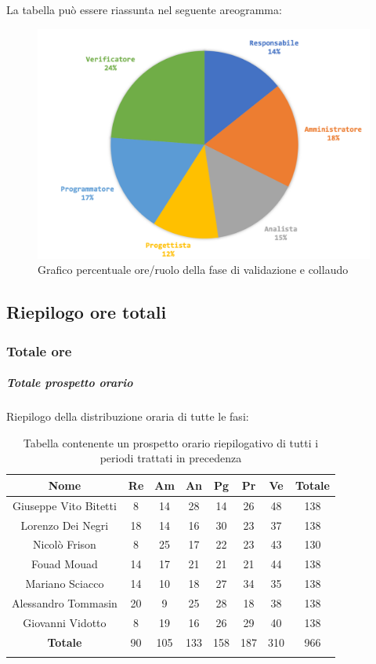 		La tabella può essere riassunta nel seguente areogramma:
		\begin{figure}[H]
			\centering
			\includegraphics[width=0.8\linewidth]{./images/preventivo/validColl2.png}
			\caption{Grafico percentuale ore/ruolo della fase di validazione e collaudo}
			\label{fig:grafico costi ruolo fase di validazione e collaudo}
		\end{figure}		
		

		
	\subsection{Riepilogo ore totali}
		\subsubsection{Totale ore}
			\subparagraph{Totale prospetto orario }
			Riepilogo della distribuzione oraria di tutte le fasi:
			\begin{longtable}{|c|c|c|c|c|c|c|c|}
				\hline
				\rowcolor{lighter-grayer}
				\textbf{Nome} & \textbf{Re} & \textbf{Am} & \textbf{An} & \textbf{Pg}  & \textbf{Pr}   & \textbf{Ve} & \textbf{Totale} \\
				\hline
				\endfirsthead
				
				\hline
				Giuseppe Vito Bitetti 		& 8 & 14 & 28 & 14 & 26 & 48 & 138\\
				\hline
				\hline
				Lorenzo Dei Negri			& 18 & 14 & 16 & 30 & 23 & 37 & 138\\
				\hline
				\hline
				Nicolò Frison				    & 8 & 25 & 17 & 22 & 23 & 43 & 130\\
				\hline
				\hline
				Fouad Mouad 				 & 14 & 17 & 21 & 21 & 21 & 44 & 138\\
				\hline
				\hline
				Mariano Sciacco 			& 14 & 10 & 18 & 27 & 34 & 35 & 138\\
				\hline
				\hline
				Alessandro Tommasin    & 20 & 9 & 25 & 28 & 18 & 38 & 138\\
				\hline
				\hline
				Giovanni Vidotto 			 & 8 & 19 & 16 & 26 & 29 & 40 & 138\\
				\hline 
				\textbf{Totale}				 & 90 & 105 & 133 & 158 & 187 & 310 & 966\\
				\hline
				\caption{Tabella contenente un prospetto orario riepilogativo di tutti i periodi trattati in precedenza}
			\end{longtable}
			\pagebreak
			
